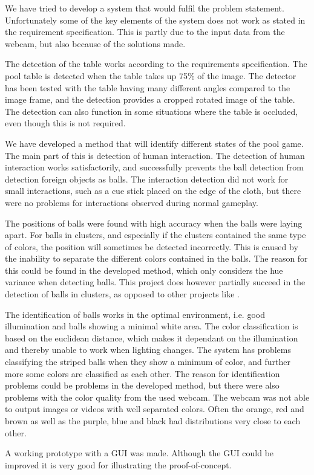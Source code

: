 
We have tried to develop a system that would fulfil the problem statement. Unfortunately some of the key elements of the system does not work as stated in the requirement specification. This is partly due to the input data from the webcam, but also because of the solutions made.

The detection of the table works according to the requirements specification. The pool table is detected when the table takes up 75\% of the image. The detector has been tested with the table having many different angles compared to the image frame, and the detection provides a cropped rotated image of the table. The detection can also function in some situations where the table is occluded, even though this is not required.

We have developed a method that will identify different states of the pool game. The main part of this is detection of human interaction. The detection of human interaction works satisfactorily, and successfully prevents the ball detection from detection foreign objects as balls. The interaction detection did not work for small interactions, such as a cue stick placed on the edge of the cloth, but there were no problems for interactions observed during normal gameplay.

The positions of balls were found with high accuracy when the balls were laying apart. For balls in clusters, and especially if the clusters contained the same type of colors, the position will sometimes be detected incorrectly. This is caused by the inability to separate the different colors contained in the balls. The reason for this could be found in the developed method, which only considers the hue variance when detecting balls. This project does however partially succeed in the detection of balls in clusters, as opposed to other projects like \cite{supportBilliard}.

The identification of balls works in the optimal environment, i.e. good illumination and balls showing a minimal white area. The color classification is based on the euclidean distance, which makes it dependant on the illumination and thereby unable to work when lighting changes.
The system has problems classifying the striped balls when they show a minimum of color, and further more some colors are classified as each other. The reason for identification problems could be problems in the developed method, but there were also problems with the color quality from the used webcam. The webcam was not able to output images or videos with well separated colors. Often the orange, red and brown as well as the purple, blue and black had distributions very close to each other.

A working prototype with a GUI was made. Although the GUI could be improved it is very good for illustrating the proof-of-concept.
